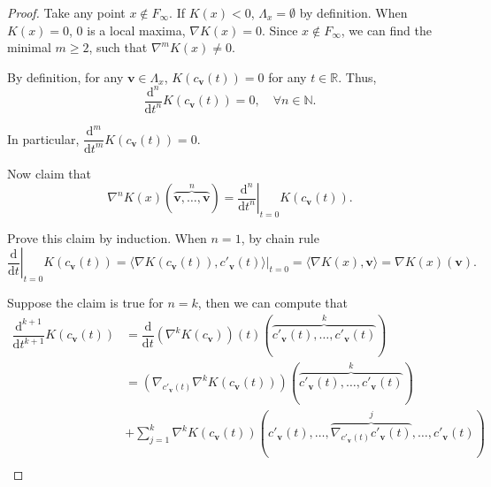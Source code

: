\documentclass[reqno,11pt]{article}
\theoremstyle{definition}
\theoremstyle{remark}
\numberwithin{equation}{section}
\begin{document}
\begin{proof}
	Take any point $x\notin F_{\infty}$. If $K(x)<0$, $\Lambda_{x}=\emptyset$ by definition. When $K(x)=0$, $0$ is a local maxima, $\nabla K(x)=0$. Since $x\notin F_{\infty}$, we can find the minimal $m\ge 2$, such that $\nabla^{m}K(x)\neq 0$.

	By definition, for any $\bm{v}\in \Lambda_{x}$, $K(c_{\bm{v}}(t))=0$ for any $t\in\mathbb{R}$. Thus,
	\begin{displaymath}
		\dfrac{\mathrm{d}^n}{\mathrm{d}t^{n}} K(c_{\bm{v}}(t))=0,\quad\forall n\in\mathbb{N}.
	\end{displaymath}

	In particular, $\dfrac{\mathrm{d}^{m}}{\mathrm{d}t^{m}} K(c_{\bm{v}}(t))=0$.

	Now claim that
	\begin{displaymath}
		\nabla^{n}K(x)(\overbrace{\bm{v},\ldots,\bm{v}}^{n})=\left.\dfrac{\mathrm{d}^{n}}{\mathrm{d}t^{n}}\right\rvert_{t=0}K(c_{\bm{v}}(t)).
	\end{displaymath}

	Prove this claim by induction. When $n=1$, by chain rule
	\begin{displaymath}
		\left.\dfrac{\mathrm{d}}{\mathrm{d}t}\right\rvert_{t=0}K(c_{\bm{v}}(t))=\langle \nabla K(c_{\bm{v}}(t)),c'_{\bm{v}}(t)\rangle\rvert_{t=0}=\langle \nabla K(x),\bm{v}\rangle=\nabla K(x)(\bm{v}).
	\end{displaymath}

	Suppose the claim is true for $n=k$, then we can compute that
	\begin{displaymath}
		\begin{aligned}
			\dfrac{\mathrm{d}^{k+1}}{\mathrm{d}t^{k+1}}K(c_{\bm{v}}(t)) & = \dfrac{\mathrm{d}}{\mathrm{d}t}(\nabla^{k} K(c_{\bm{v}}))(t)(\overbrace{c'_{\bm{v}}(t),\ldots,c'_{\bm{v}}(t)}^{k})                         \\
			                                                            & =(\nabla_{c'_{\bm{v}}(t)}\nabla^{k}K(c_{\bm{v}}(t)))(\overbrace{c'_{\bm{v}}(t),\ldots,c'_{\bm{v}}(t)}^{k})                                   \\
			                                                            & +\sum_{j=1}^k \nabla^{k}K(c_{\bm{v}}(t))(c'_{\bm{v}}(t),\ldots,\overbrace{\nabla_{c'_{\bm{v}}(t)}c'_{\bm{v}}(t)}^{j},\ldots, c'_{\bm{v}}(t)) \\
		\end{aligned}
	\end{displaymath}


\end{proof}
\end{document}

